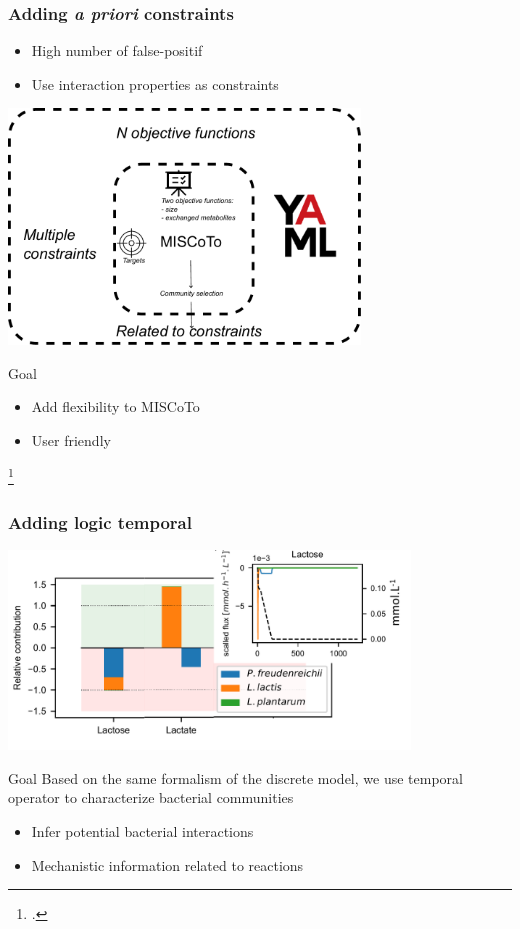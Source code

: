 \documentclass[8pt,usenames,dvipsnames]{beamer}
\begin{document}
\begin{frame}
\frametitle{Adding \textit{a priori} constraints}

\begin{itemize}
\item High number of false-positif
\item Use interaction properties as constraints
\end{itemize}
\centering
\includegraphics[width=0.7\textwidth]{figures/enrichissement.pdf}
\begin{block}{Goal}
\begin{itemize}
\item Add flexibility to MISCoTo 
\item User friendly
\end{itemize}
\end{block}

\footcite{Frioux2018}
\end{frame}

\begin{frame}
\frametitle{Adding logic temporal}
\centering
\includegraphics[width=0.8\textwidth]{figures/relative-contribution.pdf}

\begin{block}{Goal}
Based on the same formalism of the discrete model, we use temporal operator to characterize bacterial communities
\end{block}


\begin{block}{}
\begin{itemize}
\item Infer potential bacterial interactions
\item Mechanistic information related to reactions
\end{itemize}
\end{block}

\end{frame}
\end{document}
